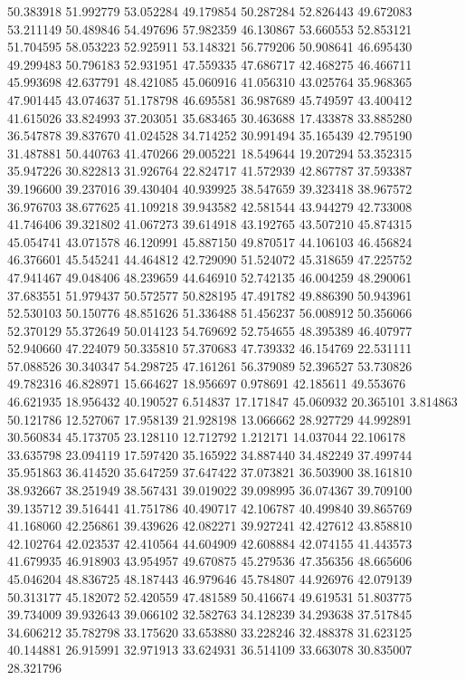 50.383918
51.992779
53.052284
49.179854
50.287284
52.826443
49.672083
53.211149
50.489846
54.497696
57.982359
46.130867
53.660553
52.853121
51.704595
58.053223
52.925911
53.148321
56.779206
50.908641
46.695430
49.299483
50.796183
52.931951
47.559335
47.686717
42.468275
46.466711
45.993698
42.637791
48.421085
45.060916
41.056310
43.025764
35.968365
47.901445
43.074637
51.178798
46.695581
36.987689
45.749597
43.400412
41.615026
33.824993
37.203051
35.683465
30.463688
17.433878
33.885280
36.547878
39.837670
41.024528
34.714252
30.991494
35.165439
42.795190
31.487881
50.440763
41.470266
29.005221
18.549644
19.207294
53.352315
35.947226
30.822813
31.926764
22.824717
41.572939
42.867787
37.593387
39.196600
39.237016
39.430404
40.939925
38.547659
39.323418
38.967572
36.976703
38.677625
41.109218
39.943582
42.581544
43.944279
42.733008
41.746406
39.321802
41.067273
39.614918
43.192765
43.507210
45.874315
45.054741
43.071578
46.120991
45.887150
49.870517
44.106103
46.456824
46.376601
45.545241
44.464812
42.729090
51.524072
45.318659
47.225752
47.941467
49.048406
48.239659
44.646910
52.742135
46.004259
48.290061
37.683551
51.979437
50.572577
50.828195
47.491782
49.886390
50.943961
52.530103
50.150776
48.851626
51.336488
51.456237
56.008912
50.356066
52.370129
55.372649
50.014123
54.769692
52.754655
48.395389
46.407977
52.940660
47.224079
50.335810
57.370683
47.739332
46.154769
22.531111
57.088526
30.340347
54.298725
47.161261
56.379089
52.396527
53.730826
49.782316
46.828971
15.664627
18.956697
0.978691
42.185611
49.553676
46.621935
18.956432
40.190527
6.514837
17.171847
45.060932
20.365101
3.814863
50.121786
12.527067
17.958139
21.928198
13.066662
28.927729
44.992891
30.560834
45.173705
23.128110
12.712792
1.212171
14.037044
22.106178
33.635798
23.094119
17.597420
35.165922
34.887440
34.482249
37.499744
35.951863
36.414520
35.647259
37.647422
37.073821
36.503900
38.161810
38.932667
38.251949
38.567431
39.019022
39.098995
36.074367
39.709100
39.135712
39.516441
41.751786
40.490717
42.106787
40.499840
39.865769
41.168060
42.256861
39.439626
42.082271
39.927241
42.427612
43.858810
42.102764
42.023537
42.410564
44.604909
42.608884
42.074155
41.443573
41.679935
46.918903
43.954957
49.670875
45.279536
47.356356
48.665606
45.046204
48.836725
48.187443
46.979646
45.784807
44.926976
42.079139
50.313177
45.182072
52.420559
47.481589
50.416674
49.619531
51.803775
39.734009
39.932643
39.066102
32.582763
34.128239
34.293638
37.517845
34.606212
35.782798
33.175620
33.653880
33.228246
32.488378
31.623125
40.144881
26.915991
32.971913
33.624931
36.514109
33.663078
30.835007
28.321796
